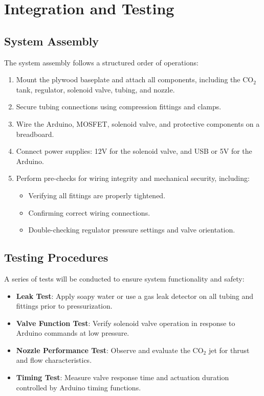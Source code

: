 \documentclass{new-aiaa}
\begin{document}
\section{Integration and Testing}

\subsection{System Assembly}
The system assembly follows a structured order of operations:
\begin{enumerate}
    \item Mount the plywood baseplate and attach all components, including the CO$_2$ tank, regulator, solenoid valve, tubing, and nozzle.
    \item Secure tubing connections using compression fittings and clamps.
    \item Wire the Arduino, MOSFET, solenoid valve, and protective components on a breadboard.
    \item Connect power supplies: 12V for the solenoid valve, and USB or 5V for the Arduino.
    \item Perform pre-checks for wiring integrity and mechanical security, including:
    \begin{itemize}
        \item Verifying all fittings are properly tightened.
        \item Confirming correct wiring connections.
        \item Double-checking regulator pressure settings and valve orientation.
    \end{itemize}
\end{enumerate}

\subsection{Testing Procedures}
A series of tests will be conducted to ensure system functionality and safety:
\begin{itemize}
    \item \textbf{Leak Test}: Apply soapy water or use a gas leak detector on all tubing and fittings prior to pressurization.
    \item \textbf{Valve Function Test}: Verify solenoid valve operation in response to Arduino commands at low pressure.
    \item \textbf{Nozzle Performance Test}: Observe and evaluate the CO$_2$ jet for thrust and flow characteristics.
    \item \textbf{Timing Test}: Measure valve response time and actuation duration controlled by Arduino timing functions.
\end{itemize}
\end{document}

